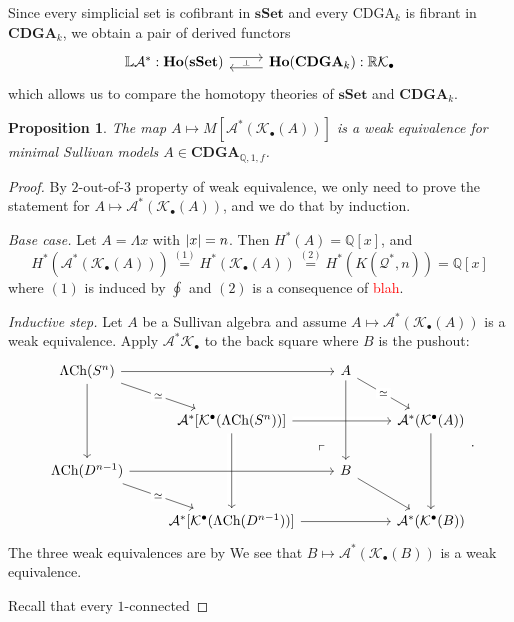 \documentclass[psamsfonts]{amsart}
\newtheorem{prop}[thm]{Proposition}
\theoremstyle{definition}
\theoremstyle{remark}
\newcommand{\Q}{\mathbb{Q}}
\newcommand{\CDGA}{\mathbf{CDGA}}
\newcommand{\Ho}{\mathbf{Ho}}
\newcommand{\ch}{\textup{Ch}}
\newcommand{\sSet}{\mathbf{sSet}}
\numberwithin{equation}{section}
\begin{document}
Since every simplicial set is cofibrant in $\sSet$ and every CDGA$_k$ is fibrant in $\CDGA_k$, we obtain a pair of derived functors
\[\begin{tikzcd}
	{\mathbb{L}\mathcal{A}^\ast:\Ho(\sSet)} & {\Ho(\CDGA_k):\mathbb{R}\mathcal{K}_\bullet}
	\arrow[""{name=0, anchor=center, inner sep=0}, shift left=1.5, from=1-1, to=1-2]
	\arrow[""{name=1, anchor=center, inner sep=0}, shift left=1.5, from=1-2, to=1-1]
	\arrow["\dashv"{anchor=center, rotate=-90}, draw=none, from=0, to=1]
\end{tikzcd}\]
which allows us to compare the homotopy theories of $\sSet$ and $\CDGA_k$.

\begin{prop}
The map $A\mapsto M[\mathcal{A}^\ast(\mathcal{K}_\bullet(A))]$ is a weak equivalence for minimal Sullivan models $A\in\CDGA_{\Q,1,f}$.  
\end{prop}
\begin{proof}
By $2$-out-of-$3$ property of weak equivalence, we only need to prove the statement for $A\mapsto\mathcal{A}^\ast(\mathcal{K}_\bullet(A))$, and we do that by induction.\medbreak

\textit{Base case.} Let $A=\Lambda x$ with $\abs{x}=n$. Then $H^\ast(A)=\Q[x]$, and
\[H^\ast(\mathcal{A}^\ast(\mathcal{K}_\bullet(A)))\stackrel{(1)}{=}H^\ast(\mathcal{K}_\bullet(A))\stackrel{(2)}{=}H^\ast(K(\mathcal{Q}^\ast,n))=\Q[x]\]
where $(1)$ is induced by $\oint$ and $(2)$ is a consequence of \textcolor{red}{blah}.\medbreak

\textit{Inductive step.} Let $A$ be a Sullivan algebra and assume $A\mapsto\mathcal{A}^\ast(\mathcal{K}_\bullet(A))$ is a weak equivalence.
Apply $\mathcal{A}^\ast\mathcal{K}_\bullet$ to the back square where $B$ is the pushout:
\[\begin{tikzcd}
	{\Lambda\ch(S^n)} && A\arrow[dd,phantom,"\ulcorner",very near end, shift right=4ex] \\
	& {\mathcal{A}^\ast[\mathcal{K}^\bullet(\Lambda\ch(S^n))]} && {\mathcal{A}^\ast(\mathcal{K}^\bullet(A))} \\
	{\Lambda\ch(D^{n-1})} && B \\
	& {\mathcal{A}^\ast[\mathcal{K}^\bullet(\Lambda\ch(D^{n-1}))]} && {\mathcal{A}^\ast(\mathcal{K}^\bullet(B))}
	\arrow["\simeq"{description}, from=1-1, to=2-2]
	\arrow[from=1-1, to=1-3]
	\arrow[from=2-2,crossing over, to=2-4]
	\arrow["\simeq"{description}, from=1-3, to=2-4]
	\arrow[from=1-1, to=3-1]
	\arrow[from=2-2,crossing over, to=4-2]
	\arrow["\simeq"{description}, from=3-1, to=4-2]
	\arrow[from=2-4, to=4-4]
	\arrow[from=3-1, to=3-3]
	\arrow[from=1-3, to=3-3]
	\arrow[from=3-3, to=4-4]
	\arrow[from=4-2, to=4-4]
\end{tikzcd}.\]
The three weak equivalences are by 
We see that $B\mapsto\mathcal{A}^\ast(\mathcal{K}_\bullet(B))$ is a weak equivalence.

Recall that every $1$-connected
\end{proof}
\end{document}
